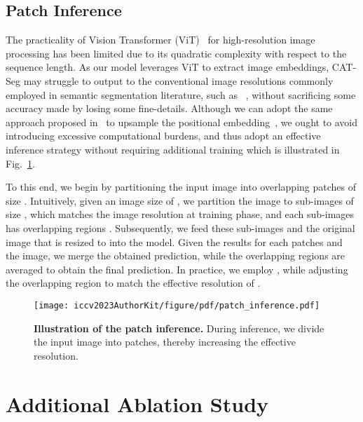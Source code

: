 \documentclass[10pt,twocolumn,letterpaper]{article}
\newcommand{\ours}{CAT-Seg\xspace}
\begin{document}
\subsection{Patch Inference}
The practicality of Vision Transformer (ViT)~\cite{dosovitskiy2020image} for high-resolution image processing has been limited due to its quadratic complexity with respect to the sequence length. As our model leverages ViT to extract image embeddings, \ours may struggle to output to the conventional image resolutions commonly employed in semantic segmentation literature, such as ~\cite{cheng2021per,ghiasi2022scaling}, without sacrificing some accuracy made by losing some fine-details. Although we can adopt the same approach proposed in~\cite{zhou2022extract} to upsample the positional embedding~\cite{zhou2022extract}, we ought to avoid introducing excessive computational burdens, and thus adopt an effective inference strategy without requiring additional training which is illustrated in Fig.~\ref{fig:patch-inference}.

To this end, we begin by partitioning the input image into overlapping patches of size . Intuitively, given an image size of , we partition the image to sub-images of size , which matches the image resolution at training phase, and each sub-images has overlapping regions . Subsequently, we feed these sub-images and the original image that is resized to  into the model. Given the results for each patches and the image, we merge the obtained prediction, while the overlapping regions are averaged to obtain the final prediction. In practice, we employ ,  while adjusting the overlapping region to match the effective resolution of .

\begin{figure}[t]
    \centering
    \texttt{[image: iccv2023AuthorKit/figure/pdf/patch\_inference.pdf]}\hfill\\
    \vspace{-5pt}
    \caption{\textbf{Illustration of the patch inference.} During inference, we divide the input image into patches, thereby increasing the effective resolution.}
    \label{fig:patch-inference}\vspace{-5pt}
\end{figure} 
\section{Additional Ablation Study}\label{B}
\end{document}
